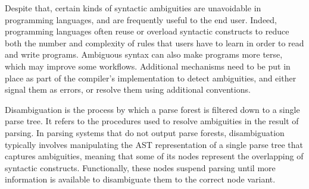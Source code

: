 Despite that, certain kinds of syntactic ambiguities are unavoidable in programming languages, and are frequently useful to the end user.
Indeed, programming languages often reuse or overload syntactic constructs to reduce both the number and complexity of rules that users have to learn in order to read and write programs.
Ambiguous syntax can also make programs more terse, which may improve some workflows.
Additional mechanisms need to be put in place as part of the compiler's implementation to detect ambiguities, and either signal them as errors, or resolve them using additional conventions.


Disambiguation is the process by which a parse forest is filtered down to a single parse tree.
It refers to the procedures used to resolve ambiguities in the result of parsing.
In parsing systems that do not output parse forests, disambiguation typically involves manipulating the \ac{AST} representation of a single parse tree that captures ambiguities, meaning that some of its nodes represent the overlapping of syntactic constructs.
Functionally, these nodes suspend parsing until more information is available to disambiguate them to the correct node variant.


